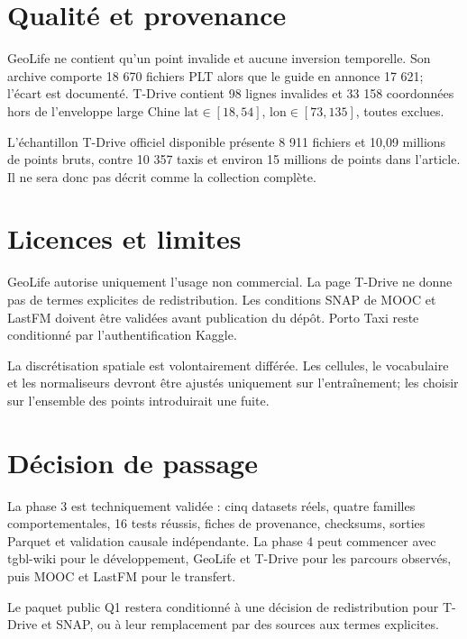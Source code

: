 \documentclass[10pt,a4paper]{article}
\begin{document}
\section{Qualité et provenance}

GeoLife ne contient qu'un point invalide et aucune inversion temporelle. Son
archive comporte 18 670 fichiers PLT alors que le guide en annonce 17 621;
l'écart est documenté. T-Drive contient 98 lignes invalides et 33 158
coordonnées hors de l'enveloppe large Chine
\(\mathrm{lat}\in[18,54]\), \(\mathrm{lon}\in[73,135]\), toutes exclues.

L'échantillon T-Drive officiel disponible présente 8 911 fichiers et 10,09
millions de points bruts, contre 10 357 taxis et environ 15 millions de points
dans l'article. Il ne sera donc pas décrit comme la collection complète.

\section{Licences et limites}

GeoLife autorise uniquement l'usage non commercial. La page T-Drive ne donne
pas de termes explicites de redistribution. Les conditions SNAP de MOOC et
LastFM doivent être validées avant publication du dépôt. Porto Taxi reste
conditionné par l'authentification Kaggle.

La discrétisation spatiale est volontairement différée. Les cellules, le
vocabulaire et les normaliseurs devront être ajustés uniquement sur
l'entraînement; les choisir sur l'ensemble des points introduirait une fuite.

\section{Décision de passage}

La phase 3 est techniquement validée : cinq datasets réels, quatre familles
comportementales, 16 tests réussis, fiches de provenance, checksums, sorties
Parquet et validation causale indépendante. La phase 4 peut commencer avec
tgbl-wiki pour le développement, GeoLife et T-Drive pour les parcours
observés, puis MOOC et LastFM pour le transfert.

Le paquet public Q1 restera conditionné à une décision de redistribution pour
T-Drive et SNAP, ou à leur remplacement par des sources aux termes explicites.
\end{document}
